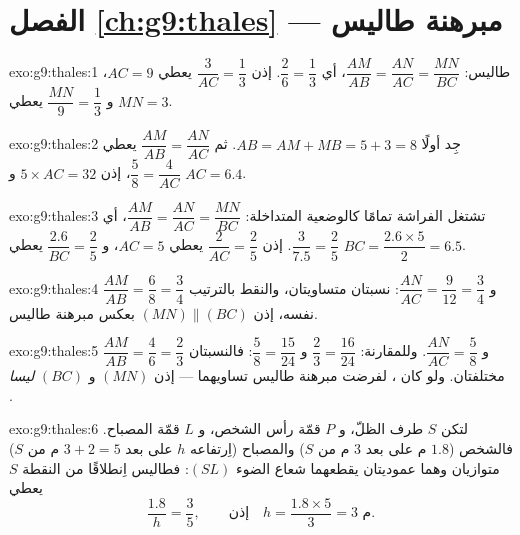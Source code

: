 \section*{الفصل \ref{ch:g9:thales} --- مبرهنة طاليس}

\begin{solution}{exo:g9:thales:1}
طاليس: $\dfrac{AM}{AB} = \dfrac{AN}{AC} = \dfrac{MN}{BC}$، أي
$\dfrac26 = \dfrac13$. إذن $\dfrac{3}{AC} = \dfrac13$ يعطي $AC = 9$،
و $\dfrac{MN}{9} = \dfrac13$ يعطي $MN = 3$.
\end{solution}

\begin{solution}{exo:g9:thales:2}
جِد أولًا $AB = AM + MB = 5 + 3 = 8$. ثم
$\dfrac{AM}{AB} = \dfrac{AN}{AC}$ يعطي $\dfrac58 = \dfrac{4}{AC}$،
إذن $5 \times AC = 32$ و $AC = 6.4$.
\end{solution}

\begin{solution}{exo:g9:thales:3}
تشتغل الفراشة تمامًا كالوضعية المتداخلة:
$\dfrac{AM}{AB} = \dfrac{AN}{AC} = \dfrac{MN}{BC}$، أي
$\dfrac{3}{7.5} = \dfrac25$. إذن $\dfrac{2}{AC} = \dfrac25$ يعطي
$AC = 5$، و $\dfrac{2.6}{BC} = \dfrac25$ يعطي
$BC = \dfrac{2.6 \times 5}{2} = 6.5$.
\end{solution}

\begin{solution}{exo:g9:thales:4}
$\dfrac{AM}{AB} = \dfrac68 = \dfrac34$
و $\dfrac{AN}{AC} = \dfrac{9}{12} = \dfrac34$: نسبتان متساويتان،
والنقط بالترتيب نفسه، إذن $(MN) \parallel (BC)$ بعكس مبرهنة طاليس.
\end{solution}

\begin{solution}{exo:g9:thales:5}
$\dfrac{AM}{AB} = \dfrac46 = \dfrac23$
و $\dfrac{AN}{AC} = \dfrac58$. وللمقارنة: $\dfrac23 = \dfrac{16}{24}$
و $\dfrac58 = \dfrac{15}{24}$: فالنسبتان مختلفتان. ولو كان
 ، لفرضت مبرهنة طاليس تساويهما --- إذن
$(MN)$ و $(BC)$ \emph{ليسا} .
\end{solution}

\begin{solution}{exo:g9:thales:6}
لتكن $S$ طرف الظلّ، و $P$ قمّة رأس الشخص، و $L$ قمّة المصباح.
فالشخص ($1.8$ م على بعد $3$ م من $S$) والمصباح (اِرتفاعه $h$ على
بعد $3 + 2 = 5$ م من $S$) متوازيان وهما  عموديتان
يقطعهما شعاع الضوء $(SL)$: فطاليس اِنطلاقًا من النقطة $S$ يعطي
\[
\frac{1.8}{h} = \frac{3}{5},
\qquad\text{إذن}\quad
h = \frac{1.8 \times 5}{3} = 3 \text{ م}.
\]
\end{solution}


